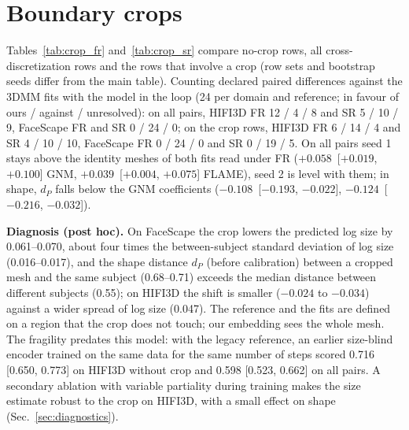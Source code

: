 \documentclass[10pt,twocolumn,letterpaper]{article}
\newcommand{\pd}[3]{$#1$~[$#2$, $#3$]}
\begin{document}
\FloatBarrier
\section{Boundary crops}
\label{sec:crop}
Tables~\ref{tab:crop_fr} and~\ref{tab:crop_sr} compare no-crop rows, all cross-discretization rows and the rows that involve a crop (row sets and bootstrap seeds differ from the main table).
Counting declared paired differences against the 3DMM fits with the model in the loop (24 per domain and reference; in favour of ours / against / unresolved): on all pairs, HIFI3D FR 12 / 4 / 8 and SR 5 / 10 / 9, FaceScape FR and SR 0 / 24 / 0; on the crop rows, HIFI3D FR 6 / 14 / 4 and SR 4 / 10 / 10, FaceScape FR 0 / 24 / 0 and SR 0 / 19 / 5. On all pairs seed 1 stays above the identity meshes of both fits read under FR (\pd{+0.058}{+0.019}{+0.100} GNM, \pd{+0.039}{+0.004}{+0.075} FLAME), seed 2 is level with them; in shape, $d_P$ falls below the GNM coefficients (\pd{-0.108}{-0.193}{-0.022}, \pd{-0.124}{-0.216}{-0.032}).

\textbf{Diagnosis (post hoc).} On FaceScape the crop lowers the predicted log size by 0.061--0.070, about four times the between-subject standard deviation of log size (0.016--0.017), and the shape distance $d_P$ (before calibration) between a cropped mesh and the same subject (0.68--0.71) exceeds the median distance between different subjects (0.55); on HIFI3D the shift is smaller ($-0.024$ to $-0.034$) against a wider spread of log size (0.047). The reference and the fits are defined on a region that the crop does not touch; our embedding sees the whole mesh. The fragility predates this model: with the legacy reference, an earlier size-blind encoder trained on the same data for the same number of steps scored 0.716 [0.650, 0.773] on HIFI3D without crop and 0.598 [0.523, 0.662] on all pairs. A secondary ablation with variable partiality during training makes the size estimate robust to the crop on HIFI3D, with a small effect on shape (Sec.~\ref{sec:diagnostics}).
\end{document}
